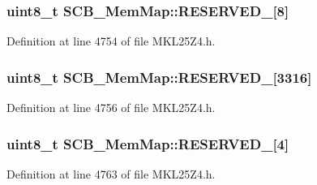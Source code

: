 \subsubsection[{\texorpdfstring{R\+E\+S\+E\+R\+V\+E\+D\+\_\+0}{RESERVED_0}}]{\setlength{\rightskip}{0pt plus 5cm}uint8\+\_\+t S\+C\+B\+\_\+\+Mem\+Map\+::\+R\+E\+S\+E\+R\+V\+E\+D\+\_\mbox{[}8\mbox{]}}\hypertarget{struct_s_c_b___mem_map_ad1b50f88903f5b63f2b92b7195511d00}{}\label{struct_s_c_b___mem_map_ad1b50f88903f5b63f2b92b7195511d00}


Definition at line 4754 of file M\+K\+L25\+Z4.\+h.

\subsubsection[{\texorpdfstring{R\+E\+S\+E\+R\+V\+E\+D\+\_\+1}{RESERVED_1}}]{\setlength{\rightskip}{0pt plus 5cm}uint8\+\_\+t S\+C\+B\+\_\+\+Mem\+Map\+::\+R\+E\+S\+E\+R\+V\+E\+D\+\_\mbox{[}3316\mbox{]}}\hypertarget{struct_s_c_b___mem_map_ab112bcf2a89a8f23d7c0a9f7c2ba687b}{}\label{struct_s_c_b___mem_map_ab112bcf2a89a8f23d7c0a9f7c2ba687b}


Definition at line 4756 of file M\+K\+L25\+Z4.\+h.

\subsubsection[{\texorpdfstring{R\+E\+S\+E\+R\+V\+E\+D\+\_\+2}{RESERVED_2}}]{\setlength{\rightskip}{0pt plus 5cm}uint8\+\_\+t S\+C\+B\+\_\+\+Mem\+Map\+::\+R\+E\+S\+E\+R\+V\+E\+D\+\_\mbox{[}4\mbox{]}}\hypertarget{struct_s_c_b___mem_map_a5aec30bee30f8ce5b1a151821cf79146}{}\label{struct_s_c_b___mem_map_a5aec30bee30f8ce5b1a151821cf79146}


Definition at line 4763 of file M\+K\+L25\+Z4.\+h.

